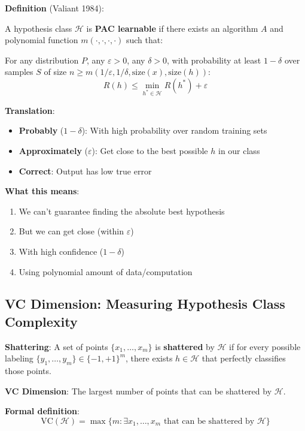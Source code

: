 \documentclass[11pt,oneside]{book}
\begin{document}
\textbf{Definition} (Valiant 1984):

A hypothesis class $\mathcal{H}$ is \textbf{PAC learnable} if there exists an algorithm $A$ and polynomial function $m(\cdot,\cdot,\cdot,\cdot)$ such that:

For any distribution $P$, any $\varepsilon > 0$, any $\delta > 0$, with probability at least $1-\delta$ over samples $S$ of size $n \geq m(1/\varepsilon, 1/\delta, \text{size}(x), \text{size}(h))$:
\begin{equation}
R(h) \leq \min_{h^*\in\mathcal{H}} R(h^*) + \varepsilon
\end{equation}

\textbf{Translation}:
\begin{itemize}
    \item \textbf{Probably} ($1-\delta$): With high probability over random training sets
    \item \textbf{Approximately} ($\varepsilon$): Get close to the best possible $h$ in our class
    \item \textbf{Correct}: Output has low true error
\end{itemize}

\textbf{What this means}:
\begin{enumerate}
    \item We can't guarantee finding the absolute best hypothesis
    \item But we can get close (within $\varepsilon$)
    \item With high confidence ($1-\delta$)
    \item Using polynomial amount of data/computation
\end{enumerate}

\subsection{VC Dimension: Measuring Hypothesis Class Complexity}

\textbf{Shattering}: A set of points $\{x_1, \ldots, x_m\}$ is \textbf{shattered} by $\mathcal{H}$ if for every possible labeling $\{y_1, \ldots, y_m\} \in \{-1,+1\}^m$, there exists $h \in \mathcal{H}$ that perfectly classifies those points.

\textbf{VC Dimension}: The largest number of points that can be shattered by $\mathcal{H}$.

\textbf{Formal definition}:
\begin{equation}
\text{VC}(\mathcal{H}) = \max\{m : \exists x_1,\ldots,x_m \text{ that can be shattered by } \mathcal{H}\}
\end{equation}
\end{document}
